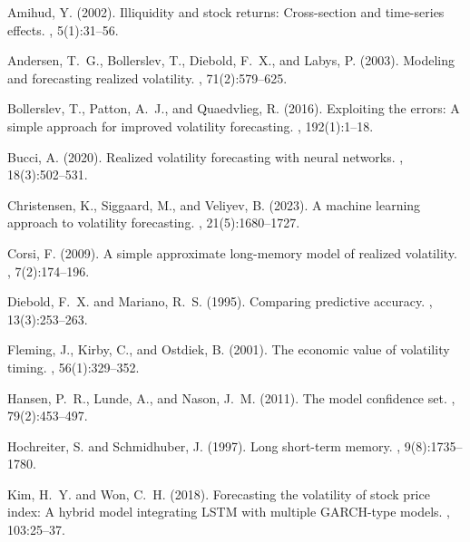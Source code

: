 \documentclass[11pt,a4paper]{article}
\begin{document}
\begin{thebibliography}{}

Amihud, Y. (2002).
\newblock Illiquidity and stock returns: Cross-section and time-series effects.
, 5(1):31--56.

Andersen, T.~G., Bollerslev, T., Diebold, F.~X., and Labys, P. (2003).
\newblock Modeling and forecasting realized volatility.
, 71(2):579--625.

Bollerslev, T., Patton, A.~J., and Quaedvlieg, R. (2016).
\newblock Exploiting the errors: A simple approach for improved volatility
  forecasting.
, 192(1):1--18.

Bucci, A. (2020).
\newblock Realized volatility forecasting with neural networks.
, 18(3):502--531.

Christensen, K., Siggaard, M., and Veliyev, B. (2023).
\newblock A machine learning approach to volatility forecasting.
, 21(5):1680--1727.

Corsi, F. (2009).
\newblock A simple approximate long-memory model of realized volatility.
, 7(2):174--196.

Diebold, F.~X. and Mariano, R.~S. (1995).
\newblock Comparing predictive accuracy.
, 13(3):253--263.

Fleming, J., Kirby, C., and Ostdiek, B. (2001).
\newblock The economic value of volatility timing.
, 56(1):329--352.

Hansen, P.~R., Lunde, A., and Nason, J.~M. (2011).
\newblock The model confidence set.
, 79(2):453--497.

Hochreiter, S. and Schmidhuber, J. (1997).
\newblock Long short-term memory.
, 9(8):1735--1780.

Kim, H.~Y. and Won, C.~H. (2018).
\newblock Forecasting the volatility of stock price index: A hybrid model
  integrating {LSTM} with multiple {GARCH}-type models.
, 103:25--37.


\end{thebibliography}
\end{document}
